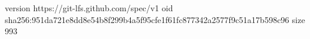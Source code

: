 version https://git-lfs.github.com/spec/v1
oid sha256:951da721e8dd8e54b8f299b4a5f95cfe1f61fc877342a2577f9c51a17b598c96
size 993
